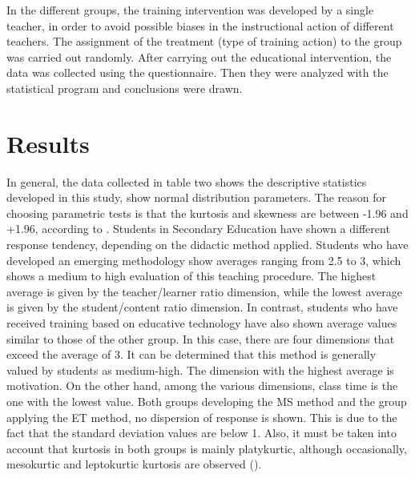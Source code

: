 \documentclass[english]{textolivre}
\begin{document}
In the different groups, the training intervention was developed by a single teacher, in order to avoid possible biases in the instructional action of different teachers. The assignment of the treatment (type of training action) to the group was carried out randomly. After carrying out the educational intervention, the data was collected using the questionnaire. Then they were analyzed with the statistical program and conclusions were drawn.

\section{Results}
In general, the data collected in table two shows the descriptive statistics developed in this study, show normal distribution parameters. The reason for choosing parametric tests is that the kurtosis and skewness are between -1.96 and +1.96, according to \textcite{joreskog2001}. Students in Secondary Education have shown a different response tendency, depending on the didactic method applied. Students who have developed an emerging methodology show averages ranging from 2.5 to 3, which shows a medium to high evaluation of this teaching procedure. The highest average is given by the teacher/learner ratio dimension, while the lowest average is given by the student/content ratio dimension. In contrast, students who have received training based on educative technology have also shown average values similar to those of the other group. In this case, there are four dimensions that exceed the average of 3. It can be determined that this method is generally valued by students as medium-high. The dimension with the highest average is motivation. On the other hand, among the various dimensions, class time is the one with the lowest value. Both groups developing the MS method and the group applying the ET method, no dispersion of response is shown. This is due to the fact that the standard deviation values are below 1. Also, it must be taken into account that kurtosis in both groups is mainly platykurtic, although occasionally, mesokurtic and leptokurtic kurtosis are observed ().
\end{document}
